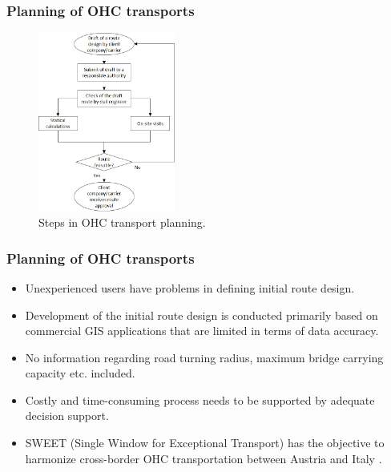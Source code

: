\documentclass{beamer}   %
\newcommand{\RNum}[1]{\uppercase\expandafter{\romannumeral #1\relax}}
\theoremstyle{break}
\begin{document}
  \begin{frame}
    \frametitle{Planning of OHC transports  \RNum{3}}
    \begin{figure}[!ht]
      \centering
      \includegraphics[width=0.4\textwidth]{../manuscript/figures/OHC Planning.jpg}
      \caption{Steps in OHC transport planning.}
      \label{fig:higher level}
    \end{figure}
  \end{frame}

  \begin{frame}
    \frametitle{Planning of OHC transports  \RNum{4} }
    \begin{itemize}
      \item Unexperienced users have problems in defining initial route design.
      \item Development of the initial route design is conducted primarily based on commercial GIS applications that are limited in terms of data accuracy.
      \item No information regarding road turning radius, maximum bridge carrying capacity etc. included.
      \item Costly and time-consuming process needs to be supported by adequate decision support.
      \item SWEET (Single Window for Exceptional Transport) has the objective to harmonize cross-border OHC transportation between Austria and Italy \cite{Sweet}.
    \end{itemize}
  \end{frame}
\end{document}
